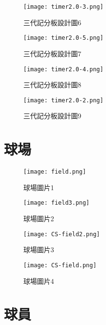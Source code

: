 \begin{figure}
  \centering
  \texttt{[image: timer2.0-3.png]}
  \caption{三代記分板設計圖6}
  \label{fig:example}
\end{figure}


\begin{figure}
  \centering
  \texttt{[image: timer2.0-5.png]}
  \caption{三代記分板設計圖7}
  \label{fig:example}
\end{figure}


\begin{figure}
  \centering
  \texttt{[image: timer2.0-4.png]}
  \caption{三代記分板設計圖8}
  \label{fig:example}
\end{figure}


\begin{figure}
  \centering
  \texttt{[image: timer2.0-2.png]}
  \caption{三代記分板設計圖9}
  \label{fig:example}
\end{figure}

\section{球場}

\begin{figure}
  \centering
  \texttt{[image: field.png]}
  \caption{球場圖片1}
  \label{fig:example}
\end{figure}


\begin{figure}
  \centering
  \texttt{[image: field3.png]}
  \caption{球場圖片2}
  \label{fig:example}
\end{figure}


\begin{figure}
  \centering
  \texttt{[image: CS-field2.png]}
  \caption{球場圖片3}
  \label{fig:example}
\end{figure}


\begin{figure}
  \centering
  \texttt{[image: CS-field.png]}
  \caption{球場圖片4}
  \label{fig:example}
\end{figure}
\section{球員}